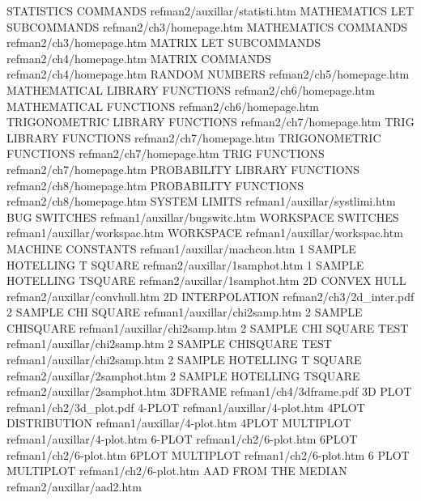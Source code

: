 STATISTICS COMMANDS                     refman2/auxillar/statisti.htm
MATHEMATICS LET SUBCOMMANDS             refman2/ch3/homepage.htm
MATHEMATICS COMMANDS                    refman2/ch3/homepage.htm
MATRIX LET SUBCOMMANDS                  refman2/ch4/homepage.htm
MATRIX COMMANDS                         refman2/ch4/homepage.htm
RANDOM NUMBERS                          refman2/ch5/homepage.htm
MATHEMATICAL LIBRARY FUNCTIONS          refman2/ch6/homepage.htm
MATHEMATICAL FUNCTIONS                  refman2/ch6/homepage.htm
TRIGONOMETRIC LIBRARY FUNCTIONS         refman2/ch7/homepage.htm
TRIG LIBRARY FUNCTIONS                  refman2/ch7/homepage.htm
TRIGONOMETRIC FUNCTIONS                 refman2/ch7/homepage.htm
TRIG FUNCTIONS                          refman2/ch7/homepage.htm
PROBABILITY LIBRARY FUNCTIONS           refman2/ch8/homepage.htm
PROBABILITY FUNCTIONS                   refman2/ch8/homepage.htm
SYSTEM LIMITS                           refman1/auxillar/systlimi.htm
BUG SWITCHES                            refman1/auxillar/bugswitc.htm
WORKSPACE SWITCHES                      refman1/auxillar/workspac.htm
WORKSPACE                               refman1/auxillar/workspac.htm
MACHINE CONSTANTS                       refman1/auxillar/machcon.htm
1 SAMPLE HOTELLING T SQUARE             refman2/auxillar/1samphot.htm
1 SAMPLE HOTELLING TSQUARE              refman2/auxillar/1samphot.htm
2D CONVEX HULL                          refman2/auxillar/convhull.htm
2D INTERPOLATION                        refman2/ch3/2d_inter.pdf
2 SAMPLE CHI SQUARE                     refman1/auxillar/chi2samp.htm
2 SAMPLE CHISQUARE                      refman1/auxillar/chi2samp.htm
2 SAMPLE CHI SQUARE TEST                refman1/auxillar/chi2samp.htm
2 SAMPLE CHISQUARE TEST                 refman1/auxillar/chi2samp.htm
2 SAMPLE HOTELLING T SQUARE             refman2/auxillar/2samphot.htm
2 SAMPLE HOTELLING TSQUARE              refman2/auxillar/2samphot.htm
3DFRAME                                 refman1/ch4/3dframe.pdf
3D PLOT                                 refman1/ch2/3d_plot.pdf
4-PLOT                                  refman1/auxillar/4-plot.htm
4PLOT DISTRIBUTION                      refman1/auxillar/4-plot.htm
4PLOT MULTIPLOT                         refman1/auxillar/4-plot.htm
6-PLOT                                  refman1/ch2/6-plot.htm
6PLOT                                   refman1/ch2/6-plot.htm
6PLOT MULTIPLOT                         refman1/ch2/6-plot.htm
6 PLOT MULTIPLOT                        refman1/ch2/6-plot.htm
AAD FROM THE MEDIAN                     refman2/auxillar/aad2.htm
